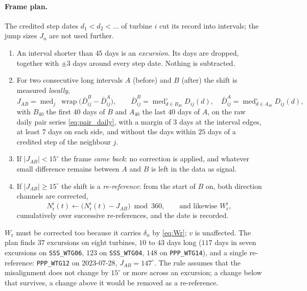 \documentclass[11pt,a4paper]{article}
\theoremstyle{remark}
\newcommand{\wrap}{\operatorname{wrap}}
\newcommand{\med}{\operatorname{med}}
\newcommand{\cmed}{\operatorname{med}^{\circ}}
\newcommand{\dg}{^{\circ}}
\newcommand{\code}[1]{\texttt{#1}}
\newcommand{\Wr}{W_{\mathrm{r}}}
\newcommand{\Nr}{N_{\mathrm{r}}}
\begin{document}
\paragraph{Frame plan.} The credited step dates $d_1<d_2<\dots$ of turbine $i$
cut its record into intervals; the jump sizes $J_n$ are not used further.
\begin{enumerate}
\item An interval shorter than $45$ days is an \emph{excursion}. Its days are
      dropped, together with $\pm3$ days around every step date. Nothing is
      subtracted.
\item For two consecutive long intervals $A$ (before) and $B$ (after) the
      shift is measured \emph{locally},
      \begin{equation}
        J_{AB} = \med_j\ \wrap\big(\bar D_{ij}^{B} - \bar D_{ij}^{A}\big),
        \qquad
        \bar D_{ij}^{B} = \cmed_{d\in B_{40}} D_{ij}(d),\quad
        \bar D_{ij}^{A} = \cmed_{d\in A_{40}} D_{ij}(d),
        \label{eq:localjump}
      \end{equation}
      with $B_{40}$ the first $40$ days of $B$ and $A_{40}$ the last $40$ days
      of $A$,
      on the raw daily pair series \eqref{eq:pair_daily}, with a margin of $3$
      days at the interval edges, at least $7$ days on each side, and without
      the days within $25$ days of a credited step of the neighbour $j$.
\item If $|J_{AB}|<15\dg$ the frame \emph{came back}: no correction is applied,
      and whatever small difference remains between $A$ and $B$ is left in the
      data as signal.
\item If $|J_{AB}|\ge15\dg$ the shift is a \emph{re-reference}: from the start
      of $B$ on, both direction channels are corrected,
      \begin{equation}
        \Nr^{i}(t) \leftarrow \big(\Nr^{i}(t) - J_{AB}\big) \bmod 360,
        \qquad \text{and likewise } \Wr^{i},
        \label{eq:destep}
      \end{equation}
      cumulatively over successive re-references, and the date is recorded.
\end{enumerate}
$\Wr$ must be corrected too because it carries $\delta_n$ by \eqref{eq:Wr}; $v$
is unaffected. The plan finds $37$ excursions on eight turbines, $10$ to $43$
days long ($117$ days in seven excursions on \code{SSS\_WTG06}, $123$ on
\code{SSS\_WTG04}, $148$ on \code{PPP\_WTG14}), and a single re-reference:
\code{PPP\_WTG12} on 2023-07-28, $J_{AB}=147\dg$. The rule assumes that the
misalignment does not change by $15\dg$ or more across an excursion; a change
below that survives, a change above it would be removed as a re-reference.
\end{document}
